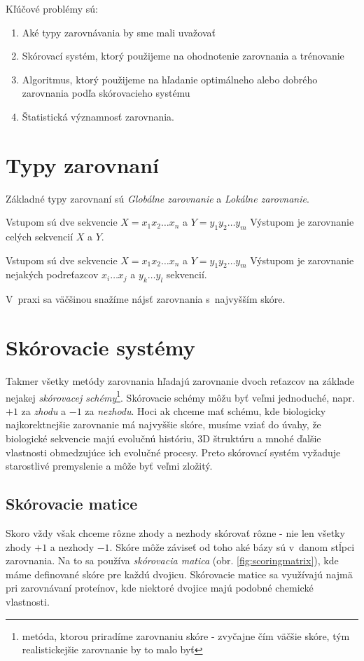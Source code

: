 Kľúčové problémy sú:
\begin{enumerate}
\item Aké typy zarovnávania by sme mali uvažovať
\item Skórovací systém, ktorý použijeme na ohodnotenie zarovnania a trénovanie
\item Algoritmus, ktorý použijeme na hľadanie optimálneho alebo dobrého zarovnania podľa skórovacieho systému
\item Štatistická významnosť zarovnania.
\end{enumerate}

\cite{durbin}

\section{Typy zarovnaní}
Základné typy zarovnaní sú \textit{Globálne zarovnanie} a \textit{Lokálne zarovnanie}.
\begin{df}
Vstupom sú dve sekvencie $X = x_1x_2\dots x_n$ a $Y = y_1y_2\dots y_m$
Výstupom je zarovnanie celých sekvencií $X$ a $Y$.
\end{df}

\begin{df}
Vstupom sú dve sekvencie $X = x_1x_2\dots x_n$ a $Y = y_1y_2\dots y_m$
Výstupom je zarovnanie nejakých podreťazcov $x_i\dots x_j$ a $y_k\dots y_l$ sekvencií.
\end{df}
V~praxi sa väčšinou snažíme nájsť zarovnania s~najvyšším skóre.
\cite{skripta}

\section{Skórovacie systémy}
Takmer všetky metódy zarovnania hľadajú zarovnanie dvoch reťazcov na základe nejakej \textit{skórovacej schémy}\footnote{metóda, ktorou priradíme zarovnaniu skóre - zvyčajne čím väčšie skóre, tým realistickejšie zarovnanie by to malo byť}. Skórovacie schémy môžu byť veľmi jednoduché, napr. $+1$ za \textit{zhodu} a $-1$ za \textit{nezhodu}. Hoci ak chceme mať schému, kde biologicky najkorektnejšie zarovnanie má najvyššie skóre, musíme vziať do úvahy, že biologické sekvencie majú evolučnú históriu, 3D štruktúru a mnohé ďalšie vlastnosti obmedzujúce ich evolučné procesy. Preto skórovací systém vyžaduje starostlivé premyslenie a môže byť veľmi zložitý.
\cite{durbin}

\subsection{Skórovacie matice}
Skoro vždy však chceme rôzne zhody a nezhody skórovať rôzne - nie len všetky zhody $+1$ a nezhody $-1$.
Skóre môže záviseť od toho aké bázy sú v~danom stĺpci zarovnania. Na to sa používa \textit{skórovacia matica} (obr. \ref{fig:scoringmatrix}), kde máme definované skóre pre každú dvojicu. Skórovacie matice sa využívajú najmä pri zarovnávaní proteínov, kde niektoré dvojice majú podobné chemické vlastnosti.
\cite{durbin, skripta}

